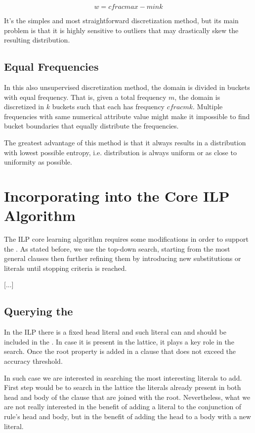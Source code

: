 \begin{equation}
 w=cfrac{max-min}{k}
\end{equation}

It's the simples and most straightforward discretization method, but its main problem is that it is highly
sensitive to outliers that may drastically skew the resulting distribution.

\subsection{Equal Frequencies}
In this also unsupervised discretization method, the domain is divided in buckets with equal frequency. That is, given a
total frequency $m$, the domain is discretized in $k$ buckets such that each has frequency $cfrac{m}{k}$. Multiple
frequencies with same numerical attribute value might make it impossible to find bucket boundaries that equally
distribute the frequencies.

The greatest advantage of this method is that it always results in a distribution with lowest possible entropy, i.e.
distribution is always uniform or as close to uniformity as possible.

\section{Incorporating \graphname into the Core ILP Algorithm}

The ILP core learning algorithm requires some modifications in order to support the \graphname. As stated before, we use
the top-down search, starting from the most general clauses then further refining them by introducing new substitutions
or literals until stopping criteria is reached.

[...]

\subsection{Querying the \graphname}

In the ILP there is a fixed head literal and such literal can and should be included in the \graphname. In case it is
present in the lattice, it plays a key role in the search. Once the root property is added in a clause that does not
exceed the accuracy threshold.

In such case we are interested in searching the most interesting literals to add. First step would be to search in the
lattice the literals already present in both head and body of the clause that are joined with the root. Nevertheless,
what we are not really interested in the benefit of adding a literal to the conjunction of rule's head and body, but in
the benefit of adding the head to a body with a new literal.

